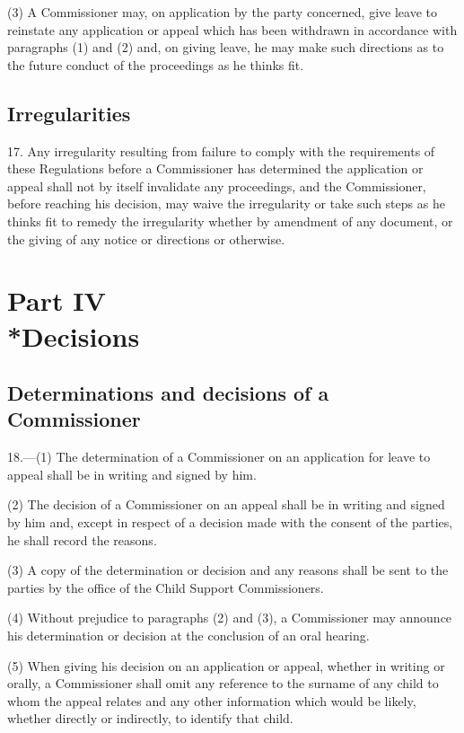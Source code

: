 \documentclass[12pt,a4paper]{article}
\begin{document}
(3) A Commissioner may, on application by the party concerned, give leave to reinstate any application or appeal which has been withdrawn in accordance with paragraphs (1) and (2) and, on giving leave, he may make such directions as to the future conduct of the proceedings as he thinks fit.

\subsection[17. Irregularities]{Irregularities}

17.  Any irregularity resulting from failure to comply with the requirements of these Regulations before a Commissioner has determined the application or appeal shall not by itself invalidate any proceedings, and the Commissioner, before reaching his decision, may waive the irregularity or take such steps as he thinks fit to remedy the irregularity whether by amendment of any document, or the giving of any notice or directions or otherwise.

\section[Part IV --- Decisions]{Part IV\\*Decisions}

\renewcommand\parthead{--- Part IV}

\subsection[18. Determinations and decisions of a Commissioner]{Determinations and decisions of a Commissioner}

18.—(1) The determination of a Commissioner on an application for leave to appeal shall be in writing and signed by him.

(2) The decision of a Commissioner on an appeal shall be in writing and signed by him and, except in respect of a decision made with the consent of the parties, he shall record the reasons.

(3) A copy of the determination or decision and any reasons shall be sent to the parties by the office of the Child Support Commissioners.

(4) Without prejudice to paragraphs (2) and (3), a Commissioner may announce his determination or decision at the conclusion of an oral hearing.

(5) When giving his decision on an application or appeal, whether in writing or orally, a Commissioner shall omit any reference to the surname of any child to whom the appeal relates and any other information which would be likely, whether directly or indirectly, to identify that child.
\end{document}

